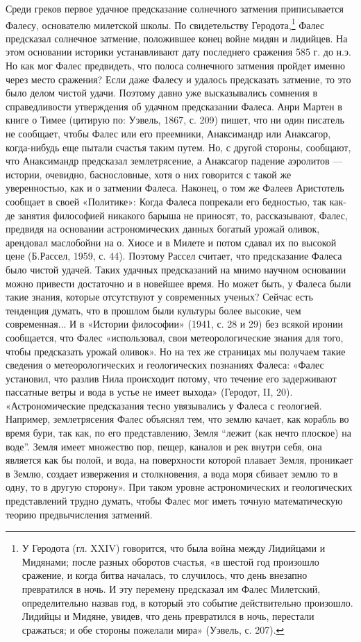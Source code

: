 Среди греков первое удачное предсказание солнечного затмения
приписывается Фалесу, основателю милетской школы. По свидетельству
Геродота,\footnote{У Геродота (гл. XXIV) говорится, что была война
между Лидийцами и Мидянами; после разных оборотов счастья, «в
шестой год произошло сражение, и когда битва началась, то
случилось, что день внезапно превратился в ночь. И эту
перемену предсказал им Фалес Милетский, определительно назвав
год, в который это событие действительно произошло. Лидийцы и
Мидяне, увидев, что день превратился в ночь, перестали
сражаться; и обе стороны пожелали мира» (Уэвель, с. 207).} Фалес
предсказал солнечное затмение, положившее конец войне мидян и
лидийцев. На этом основании историки устанавливают дату последнего
сражения 585 г. до н.э. Но как мог Фалес предвидеть, что полоса
солнечного затмения пройдет именно через место сражения? Если даже
Фалесу и удалось предсказать затмение, то это было делом чистой удачи.
Поэтому давно уже высказывались сомнения в справедливости утверждения
об удачном предсказании Фалеса. Анри Мартен в книге о Тимее (цитирую
по: Уэвель, 1867, с. 209) пишет, что ни один писатель не сообщает,
чтобы Фалес или его преемники, Анаксимандр или Анаксагор, когда-нибудь
еще пытали счастья таким путем. Но, с другой стороны, сообщают, что
Анаксимандр предсказал землетрясение, а Анаксагор падение аэролитов
--- истории, очевидно, баснословные, хотя о них говорится с такой же
уверенностью, как и о затмении Фалеса. Наконец, о том же Фалеев
Аристотель сообщает в своей «Политике»: Когда Фалеса попрекали его
бедностью, так как-де занятия философией никакого барыша не приносят,
то, рассказывают, Фалес, предвидя на основании астрономических данных
богатый урожай оливок, арендовал маслобойни на о. Хиосе и в Милете и
потом сдавал их по высокой цене (Б.Рассел, 1959, с. 44). Поэтому
Рассел считает, что предсказание Фалеса было чистой удачей. Таких
удачных предсказаний на мнимо научном основании можно привести
достаточно и в новейшее время. Но может быть, у Фалеса были такие
знания, которые отсутствуют у современных ученых? Сейчас есть
тенденция думать, что в прошлом были культуры более высокие, чем
современная... И в «Истории философии» (1941, с. 28 и 29) без всякой
иронии сообщается, что Фалес «использовал, свои метеорологические
знания для того, чтобы предсказать урожай оливок». Но на тех же
страницах мы получаем такие сведения о метеорологических и
геологических познаниях Фалеса: «Фалес установил, что разлив Нила
происходит потому, что течение его задерживают пассатные ветры и вода
в устье не имеет выхода» (Геродот, II, 20). «Астрономические
предсказания тесно увязывались у Фалеса с геологией. Например,
землетрясения Фалес объяснял тем, что землю качает, как корабль во
время бури, так как, по его представлению, Земля ``лежит (как нечто
плоское) на воде''. Земля имеет множество пор, пещер, каналов и рек
внутри себя, она является как бы полой, и вода, на поверхности которой
плавает Земля, проникает в Землю, создает извержения и столкновения, а
вода моря сбивает землю то в одну, то в другую сторону». При таком
уровне астрономических и геологических представлений трудно думать,
чтобы Фалес мог иметь точную математическую теорию предвычисления
затмений.

